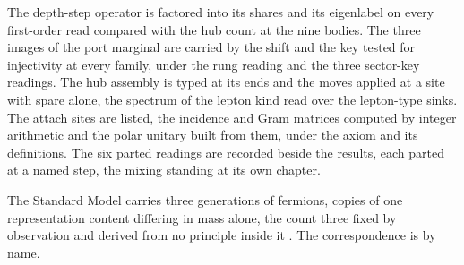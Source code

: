 The depth-step operator is factored into its shares and its eigenlabel on every first-order read compared with the hub count at the nine bodies. The three images of the port marginal are carried by the shift and the key tested for injectivity at every family, under the rung reading and the three sector-key readings. The hub assembly is typed at its ends and the moves applied at a site with spare alone, the spectrum of the lepton kind read over the lepton-type sinks. The attach sites are listed, the incidence and Gram matrices computed by integer arithmetic and the polar unitary built from them, under the axiom and its definitions. The six parted readings are recorded beside the results, each parted at a named step, the mixing standing at its own chapter.
\begin{chbridge}
The Standard Model carries three generations of fermions, copies of one representation content differing in mass alone, the count three fixed by observation and derived from no principle inside it \cite{Weinberg1967}. The correspondence is by name.
\end{chbridge}

